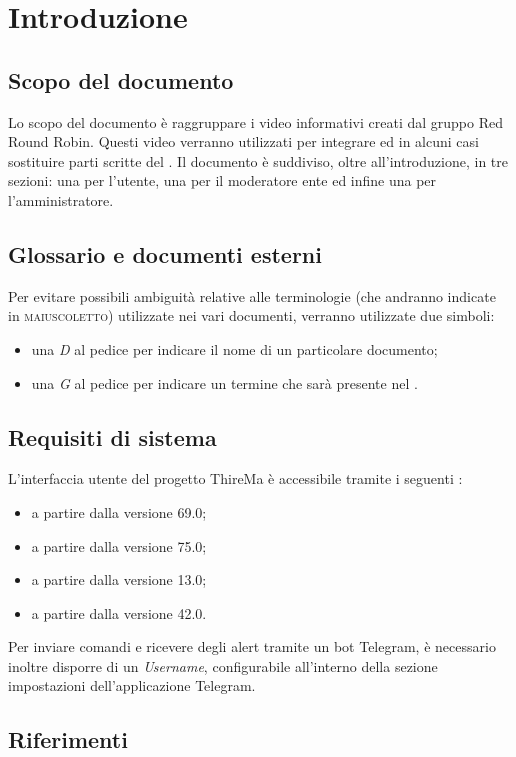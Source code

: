 \section{Introduzione}
	\subsection{Scopo del documento}
		Lo scopo del documento è raggruppare i video informativi creati dal gruppo Red Round Robin. Questi video verranno utilizzati per integrare ed in alcuni casi sostituire parti scritte del . Il documento è suddiviso, oltre all'introduzione, in tre sezioni: una per l'utente, una per il moderatore ente ed infine una per l'amministratore.	
	\subsection{Glossario e documenti esterni}
		Per evitare possibili ambiguità relative alle terminologie (che andranno indicate in \textsc{maiuscoletto}) utilizzate nei vari documenti, verranno utilizzate due simboli:
		\begin{itemize}
			\item una \textit{D} al pedice per indicare il nome di un particolare documento;
			\item una \textit{G} al pedice per indicare un termine che sarà presente nel .
		\end{itemize}
	\subsection{Requisiti di sistema}
		L'interfaccia utente del progetto ThireMa è accessibile tramite i seguenti :
		\begin{itemize}
		 	\item {} a partire dalla versione 69.0;
		 	\item {} a partire dalla versione 75.0;
		 	\item {} a partire dalla versione 13.0;
		 	\item {} a partire dalla versione 42.0.
		\end{itemize} 
		Per inviare comandi e ricevere degli alert tramite un bot Telegram, è necessario inoltre disporre di un \textit{Username}, configurabile all'interno della sezione impostazioni dell'applicazione Telegram.
	\subsection{Riferimenti}
